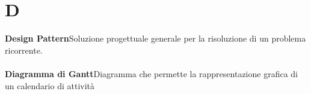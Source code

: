 \newpage
\section{D}\label{l:D}
\textbf{Design Pattern}\newline Soluzione progettuale generale per la risoluzione di un problema ricorrente.\\\\
\textbf{Diagramma di Gantt}\newline Diagramma che permette la rappresentazione grafica di un calendario di attività \\\\
